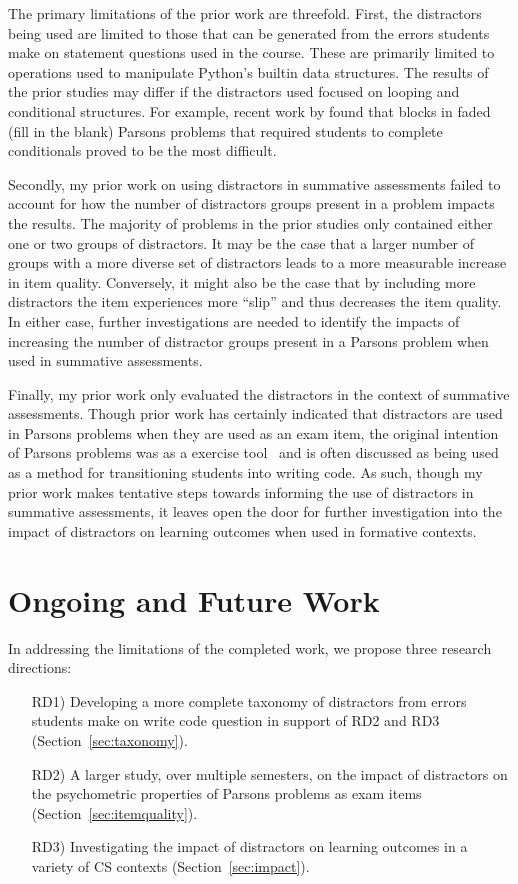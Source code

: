 \documentclass[authorversion,nonacm]{acmart}
\begin{document}
The primary limitations of the prior work are threefold. First, the distractors
being used are limited to those that can be generated from the errors students
make on statement questions used in the course. These are primarily limited to
operations used to manipulate Python's builtin data structures. The results of
the prior studies may differ if the distractors used focused on looping and
conditional structures. For example, recent work by
\citet{fromont2023exploring} found that blocks in faded (fill in the blank)
Parsons problems that required students to complete conditionals proved to be
the most difficult.


Secondly, my prior work on using distractors in summative assessments 
failed to account for how the number of distractors groups present in a problem
impacts the results. The majority of problems in the prior studies only
contained either one or two groups of distractors. It may be the case that
a larger number of groups with a more diverse set of distractors leads to 
a more measurable increase in item quality. Conversely, it might also be the
case that by including more distractors the item experiences more ``slip'' 
and thus decreases the item quality. In either case, further investigations
are needed to identify the impacts of increasing the number of distractor 
groups present in a Parsons problem when used in summative assessments.


Finally, my prior work only evaluated the distractors in the context of
summative assessments. Though prior work has certainly indicated that
distractors are used in Parsons problems when they are used as an exam item,
the original intention of Parsons problems was as a exercise
tool~\cite{parsons2006parson} and is often discussed as being used as a method
for transitioning students into writing code. As such, though my prior work
makes tentative steps towards informing the use of distractors in summative
assessments, it leaves open the door for further investigation into the impact
of distractors on learning outcomes when used in formative contexts.

\section{Ongoing and Future Work}

In addressing the limitations of the completed work, we propose three research
directions:
\begin{enumerate}
  \item[RD1)] Developing a more complete taxonomy of distractors from errors
    students make on write code question in support of RD2 and RD3
    (Section~\ref{sec:taxonomy}).
  \item[RD2)] A larger study, over multiple semesters, on the impact of distractors on the psychometric
    properties of Parsons problems as exam items (Section~\ref{sec:itemquality}).
  \item[RD3)] Investigating the impact of distractors on learning outcomes in a
    variety of CS contexts (Section~\ref{sec:impact}).
\end{enumerate}
\end{document}

